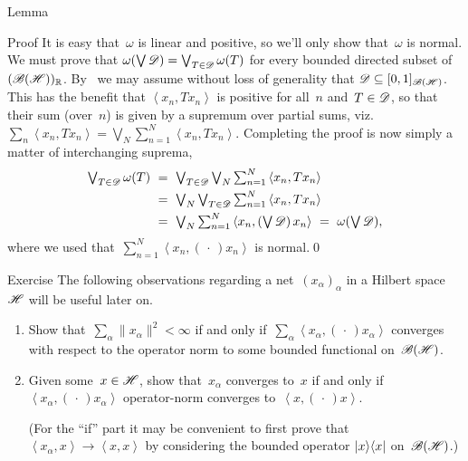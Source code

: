 \documentclass[a]{subfiles}
\begin{document}
\begin{parsec}
\begin{point}{Lemma}
\begin{point}{Proof}
It is easy that~$\omega$ is linear and positive,
so we'll only show that~$\omega$ is normal.
We must prove that $\omega(\bigvee \mathscr{D})=\bigvee_{T\in\mathscr{D}} \omega(T)$
for every bounded directed subset of~$(\mathscr{B}(\mathscr{H}))_{\mathbb{R}}$.
By~
we may assume without loss of generality that 
$\mathscr{D}\subseteq [0,1]_{\mathscr{B}(\mathscr{H})}$.
This has the benefit that $\left<x_n,T x_n\right>$
is positive for all~$n$ and~$T\in\mathscr{D}$,
so that their sum (over~$n$) is given by
a supremum over partial sums, viz.~$\sum_n\left<x_n,Tx_n\right>
=\bigvee_N\sum_{n=1}^N\left<x_n,Tx_n\right>$.
Completing the proof is now simply a matter of
interchanging suprema,
\begin{alignat*}{3}
	\textstyle \bigvee_{T\in \scrD} \omega(T)
	\ &=\ 
	\textstyle\bigvee_{T\in \scrD} \bigvee_N \sum_{n=1}^N 
	\left<x_n,Tx_n\right>\\
	\ &=\ 
	\textstyle\bigvee_N \bigvee_{T\in \scrD}\sum_{n=1}^N 
	\left<x_n,Tx_n\right>\\
	\ &=\ 
	\textstyle\bigvee_N \sum_{n=1}^N \left<x_n,(\bigvee \scrD )\,x_n\right>
	\ =\ \textstyle\omega(\bigvee\scrD),
\end{alignat*}
where we used that~$\sum_{n=1}^N \left<x_n,(\,\cdot\,)x_n\right>$
is normal.\qed
\end{point}
\end{point}
\begin{point}{Exercise}%
The following observations
regarding
a net~$(x_\alpha)_\alpha$ in a Hilbert space~$\mathscr{H}$
will be useful later on.
\begin{enumerate}
\item
Show that~$\sum_\alpha \|x_\alpha\|^2<\infty$
if and only if~$\sum_\alpha \left<x_\alpha,(\,\cdot\,)x_\alpha\right>$
converges with respect to the operator norm
to some bounded functional on~$\mathscr{B}(\mathscr{H})$.
\item
Given some~$x\in \mathscr{H}$,
show that~$x_\alpha$ converges to~$x$
if and only if  $\left<x_\alpha,(\,\cdot\,)x_\alpha\right>$
operator-norm converges to~$\left<x,(\,\cdot\,)x\right>$.

(For the ``if'' part it may be convenient
to first prove that $\left<x_\alpha,x\right>\to \left<x,x\right>$
by considering the bounded operator
$\left|x\right>\!\left<x\right|$ on~$\mathscr{B}(\mathscr{H})$.)

\end{enumerate}
\end{point}
\end{parsec}
\end{document}
